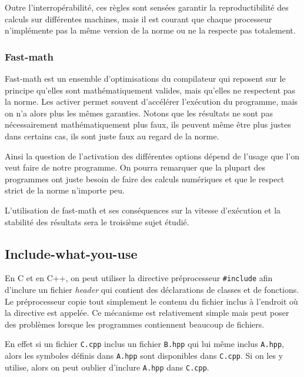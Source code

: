\documentclass[a4paper,11pt]{report}
\begin{document}
Outre l'interropérabilité, ces règles sont sensées garantir la reproductibilité des calculs sur différentes machines,
mais il est courant que chaque processeur n'implémente pas la même version de la norme ou ne la respecte pas totalement.

\subsubsection{Fast-math}

Fast-math est un ensemble d'optimisations du compilateur qui reposent sur le principe qu'elles sont mathématiquement valides, mais qu'elles ne respectent pas la norme.
Les activer permet souvent d'accélérer l'exécution du programme, mais on n'a alors plus les mêmes garanties.
Notons que les résultats ne sont pas nécessairement mathématiquement plus faux, ils peuvent même être plus justes dans certains cas, ils sont juste faux au regard de la norme.

Ainsi la question de l'activation des différentes options dépend de l'usage que l'on veut faire de notre programme.
On pourra remarquer que la plupart des programmes ont juste besoin de faire des calculs numériques et que le respect strict de la norme n'importe peu.

\bigskip
L'utilisation de fast-math et ses conséquences sur la vitesse d'exécution et la stabilité des résultats sera le troisième sujet étudié.

\subsection{Include-what-you-use}\label{section:iwyu}
En C et en C++, on peut utiliser la directive préprocesseur \verb'#include' afin d'inclure un fichier \emph{header} qui contient des déclarations de classes et de fonctions.
Le préprocesseur copie tout simplement le contenu du fichier inclus à l'endroit où la directive est appelée.
Ce mécanisme est relativement simple mais peut poser des problèmes lorsque les programmes contiennent beaucoup de fichiers.

En effet si un fichier \verb'C.cpp' inclus un fichier \verb'B.hpp' qui lui même inclus \verb'A.hpp', alors les symboles définis dans \verb'A.hpp' sont disponibles dans \verb'C.cpp'.
Si on les y utilise, alors on peut oublier d'inclure \verb'A.hpp' dans \verb'C.cpp'.
\end{document}
